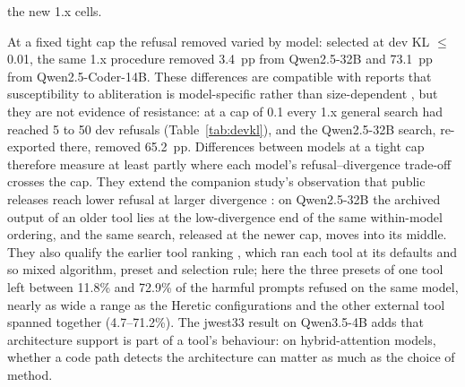 the new 1.x cells.

At a fixed tight cap the refusal removed varied by model: selected at dev KL $\le$ 0.01, the same 1.x procedure removed
3.4~pp from Qwen2.5-32B and 73.1~pp from Qwen2.5-Coder-14B. These differences are compatible with reports that
susceptibility to abliteration is model-specific rather than size-dependent \cite{hadetskyi2026not}, but they are not
evidence of resistance: at a cap of 0.1 every 1.x general search had reached 5 to 50 dev refusals
(Table~\ref{tab:devkl}), and the Qwen2.5-32B search, re-exported there, removed 65.2~pp. Differences between models at
a tight cap therefore measure at least partly where each model's refusal--divergence trade-off crosses the cap. They extend the companion study's observation that public releases reach lower refusal at larger
divergence \cite{young2026harder}: on Qwen2.5-32B the archived output of an older tool lies at the low-divergence end
of the same within-model ordering, and the same search, released at the newer cap, moves into its middle. They also
qualify the earlier tool ranking \cite{young2025comparative}, which ran each tool at its defaults and so mixed
algorithm, preset and selection rule; here the three presets of one tool left between 11.8\% and 72.9\% of the
harmful prompts refused on the same model, nearly as wide a range as the Heretic configurations and the other
external tool spanned together (4.7--71.2\%). The jwest33 result on Qwen3.5-4B adds that architecture support is
part of a tool's behaviour: on hybrid-attention models, whether a code path detects the architecture can matter as
much as the choice of method.


